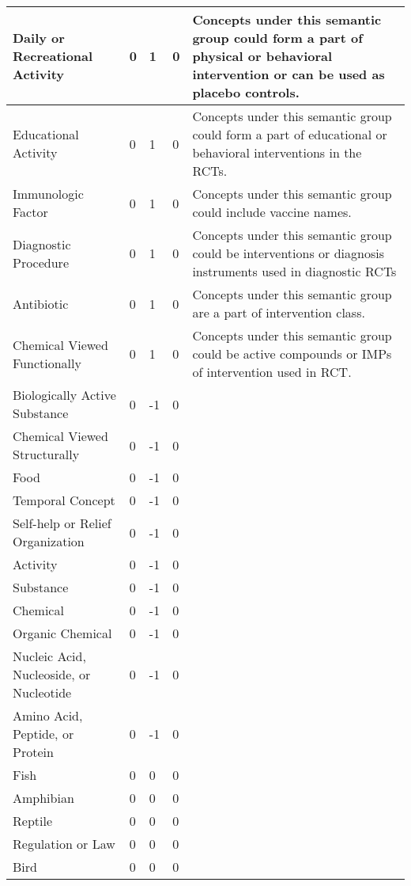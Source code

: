 \documentclass[10.7pt,]{article}
\begin{document}
\begin{longtable}{|l|p{0.3cm}|p{0.3cm}|p{0.3cm}|p{7.9cm}|}
        Daily or Recreational Activity & 0 & 1 & 0 & Concepts under this semantic group could form a part of physical or behavioral intervention or can be used as placebo controls. \\ \hline
        Educational Activity & 0 & 1 & 0 & Concepts under this semantic group could form a part of educational or behavioral interventions in the RCTs. \\ \hline
        Immunologic Factor & 0 & 1 & 0 & Concepts under this semantic group could include vaccine names. \\ \hline
        Diagnostic Procedure & 0 & 1 & 0 & Concepts under this semantic group could be interventions or diagnosis instruments used in diagnostic RCTs \\ \hline
        Antibiotic & 0 & 1 & 0 & Concepts under this semantic group are a part of intervention class. \\ \hline
        Chemical Viewed Functionally & 0 & 1 & 0 & Concepts under this semantic group could be active compounds or IMPs of intervention used in RCT. \\ \hline
        Biologically Active Substance & 0 & -1 & 0 & ~ \\ \hline
        Chemical Viewed Structurally & 0 & -1 & 0 & ~ \\ \hline
        Food & 0 & -1 & 0 & ~ \\ \hline
        Temporal Concept & 0 & -1 & 0 & ~ \\ \hline
        Self-help or Relief Organization & 0 & -1 & 0 & ~ \\ \hline
        Activity & 0 & -1 & 0 & ~ \\ \hline
        Substance & 0 & -1 & 0 & ~ \\ \hline
        Chemical & 0 & -1 & 0 & ~ \\ \hline
        Organic Chemical & 0 & -1 & 0 & ~ \\ \hline
        Nucleic Acid, Nucleoside, or Nucleotide & 0 & -1 & 0 & ~ \\ \hline
        Amino Acid, Peptide, or Protein & 0 & -1 & 0 & ~ \\ \hline
        Fish & 0 & 0 & 0 & ~ \\ \hline
        Amphibian & 0 & 0 & 0 & ~ \\ \hline
        Reptile & 0 & 0 & 0 & ~ \\ \hline
        Regulation or Law & 0 & 0 & 0 & ~ \\ \hline
        Bird & 0 & 0 & 0 & ~ \\ \hline

\end{longtable}
\end{document}
